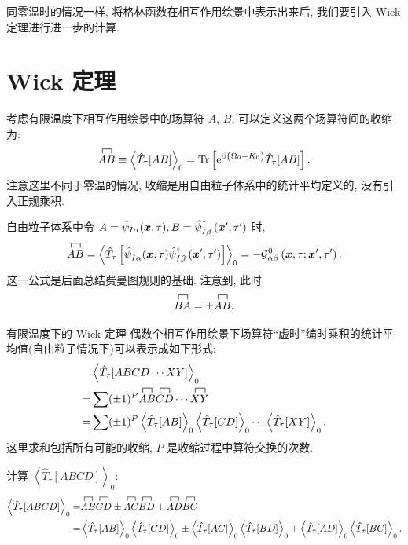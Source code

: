同零温时的情况一样, 将格林函数在相互作用绘景中表示出来后, 我们要引入 Wick 定理进行进一步的计算.


\section{Wick 定理}
考虑有限温度下相互作用绘景中的场算符 $A$, $B$, 可以定义这两个场算符间的收缩为:
\begin{equation}
\contraction{}{A}{}{B}{A B} \equiv\left\langle\hat{T}_\tau[A B]\right\rangle_0=\operatorname{Tr}\left[\e^{\beta\left(\Omega_0-\hat{K}_0\right)} \hat{T}_\tau[A B]\right] .
\end{equation}
注意这里不同于零温的情况, 收缩是用自由粒子体系中的统计平均定义的, 没有引入正规乘积. 
\begin{example}
自由粒子体系中令 $A=\hat{\psi}_{I \alpha}(\boldsymbol{x}, \tau), B=\hat{\psi}_{I \beta}^{\dagger}\left(\boldsymbol{x}^{\prime}, \tau^{\prime}\right)$ 时,
\begin{equation}
\contraction{}{A}{}{B}{A B}=\left\langle\hat{T}_\tau\left[\hat{\psi}^{}_{I \alpha}(\vct{x}, \tau) \hat{\psi}_{I \beta}^{\dagger}\left(\vct{x}^{\prime}, \tau^{\prime}\right)\right]\right\rangle_0=-\mathcal{G}_{\alpha \beta}^0\left(\vct{x}, \tau ; \vct{x}^{\prime}, \tau^{\prime}\right) .
\end{equation}
这一公式是后面总结费曼图规则的基础. 注意到, 此时
\begin{equation}
\contraction{}{B}{}{A}{BA}=\pm \contraction{}{A}{}{B}{A B}.
\end{equation}
\end{example}
\begin{theorem}{有限温度下的 Wick 定理}{}
偶数个相互作用绘景下场算符“虚时”编时乘积的统计平均值(自由粒子情况下)可以表示成如下形式:
\begin{align}
& \left\langle\hat{T}_\tau[A B C D\cdots X Y]\right\rangle_0\nonumber \\
= &  \sum(\pm 1)^P \contraction{}{A}{}{B}{A B} \contraction{}{C}{}{D}{CD}\cdots \contraction{}{X}{}{Y}{XY}\nonumber\\
= &\sum(\pm 1)^P\left\langle\hat{T}_\tau[A B]\right\rangle_0\left\langle\hat{T}_\tau[C D]\right\rangle_0 \cdots\left\langle\hat{T}_\tau[X Y]\right\rangle_0 ,
\end{align}
这里求和包括所有可能的收缩, $P$ 是收缩过程中算符交换的次数.
\end{theorem}

\begin{example}
计算 $\left\langle\hat{T}_\tau[A B C D]\right\rangle_0$:
\begin{align}
\left\langle\hat{T}_\tau[A B C D]\right\rangle_0=&\contraction{}{A}{}{B}{A B} \contraction{}{C}{}{D}{CD} \pm \contraction{}{A}{}{C}{A C} \contraction{}{B}{}{D}{BD} +\contraction{}{A}{}{D}{AD} \contraction{}{B}{}{C}{BC}\nonumber\\
=&\left\langle\hat{T}_\tau[A B]\right\rangle_0\left\langle\hat{T}_\tau[C D]\right\rangle_0\pm\left\langle\hat{T}_\tau[A C]\right\rangle_0\left\langle\hat{T}_\tau[B D]\right\rangle_0+\left\langle\hat{T}_\tau[A D]\right\rangle_0\left\langle\hat{T}_\tau[BC]\right\rangle_0.
\end{align}
\end{example}

